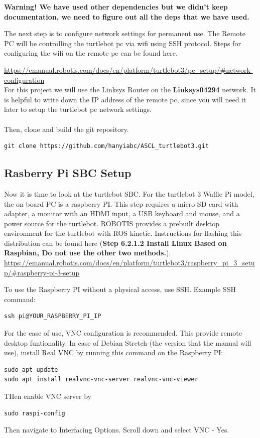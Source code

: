 \documentclass[12]{article}
\begin{document}
\textbf{Warning! We have used other dependencies but we didn't keep documentation, we need to figure out all the deps that we have used.}

The next step is to configure network settings for permanent use. 
The Remote PC will be controlling the turtlebot pc via wifi using SSH protocol. 
Steps for configuring the wifi on the remote pc can be found here.

\url {https://emanual.robotis.com/docs/en/platform/turtlebot3/pc_setup/#network-configuration} \\

For this project we will use the Linksys Router on the \textbf{Linksys04294} network. It is helpful to write down the IP address of the remote pc, since you will need it later to setup the turtlebot pc network settings.\\\\

Then, clone and build the git repository. 
\begin{lstlisting}[style=bash]
git clone https://github.com/hanyiabc/ASCL_turtlebot3.git
\end{lstlisting}


\subsection{Rasberry Pi SBC Setup}

Now it is time to look at the turtlebot SBC. For the turtlebot 3 Waffle Pi model, the on board PC is a raspberry PI. 
This step requires a micro SD card with adapter, a monitor with an HDMI input, a USB keyboard and mouse, and a power source for the turtlebot. 
ROBOTIS provides a prebuilt desktop environment for the turtlebot with ROS kinetic. Instructions for flashing this distribution can be found here (\textbf{Step 6.2.1.2 Install Linux Based on Raspbian, Do not use the other two methods.}).\\
\url {https://emanual.robotis.com/docs/en/platform/turtlebot3/raspberry_pi_3_setup/#raspberry-pi-3-setup}

To use the Raspberry PI without a physical access, use SSH. Example SSH command:

\begin{lstlisting}[style=bash]
ssh pi@YOUR_RASPBERRY_PI_IP
\end{lstlisting}

For the ease of use, VNC configuration is recommended. This provide remote desktop funtionality. In case of Debian Stretch (the version that the manual will use), install Real VNC by running this command on the Raspberry PI:
\begin{lstlisting}[style=bash]
sudo apt update
sudo apt install realvnc-vnc-server realvnc-vnc-viewer
\end{lstlisting}
THen enable VNC server by 
\begin{lstlisting}[style=bash]
sudo raspi-config
\end{lstlisting}
Then navigate to Interfacing Options.
Scroll down and select VNC - Yes.
\end{document}
